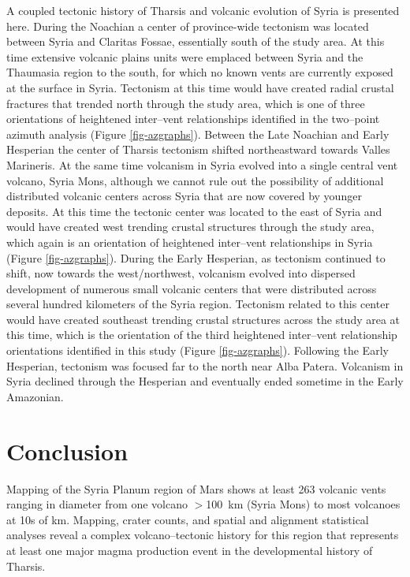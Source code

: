 A coupled tectonic history of Tharsis and volcanic evolution of Syria is presented here.  During the Noachian a center of province-wide tectonism was located between Syria and Claritas Fossae, essentially south of the study area. At this time extensive volcanic plains units were emplaced between Syria and the Thaumasia region to the south, for which no known vents are currently exposed at the surface in Syria. Tectonism at this time would have created radial crustal fractures that trended north through the study area, which is one of three orientations of heightened inter--vent relationships identified in the two--point azimuth analysis (Figure \ref{fig-azgraphs}). Between the Late Noachian and Early Hesperian the center of Tharsis tectonism shifted northeastward towards Valles Marineris.  At the same time volcanism in Syria evolved into a single central vent volcano, Syria Mons, although we cannot rule out the possibility of additional distributed volcanic centers across Syria that are now covered by younger deposits. At this time the tectonic center was located to the east of Syria and would have created west trending crustal structures through the study area, which again is an orientation of heightened inter--vent relationships in Syria (Figure \ref{fig-azgraphs}). During the Early Hesperian, as tectonism continued to shift, now towards the west/northwest, volcanism evolved into dispersed development of numerous small volcanic centers that were distributed across several hundred kilometers of the Syria region.  Tectonism related to this center would have created southeast trending crustal structures across the study area at this time, which is the orientation of the third heightened inter--vent relationship orientations identified in this study (Figure \ref{fig-azgraphs}).  Following the Early Hesperian, tectonism was focused far to the north near Alba Patera. Volcanism in Syria declined through the Hesperian and eventually ended sometime in the Early Amazonian.

\section{Conclusion}
Mapping of the Syria Planum region of Mars shows at least 263 volcanic vents ranging in diameter from one volcano $>$100~km (Syria Mons) to most volcanoes at 10s of km. Mapping, crater counts, and spatial and alignment statistical analyses reveal a complex volcano--tectonic history for this region that represents at least one major magma production event in the developmental history of Tharsis. 

